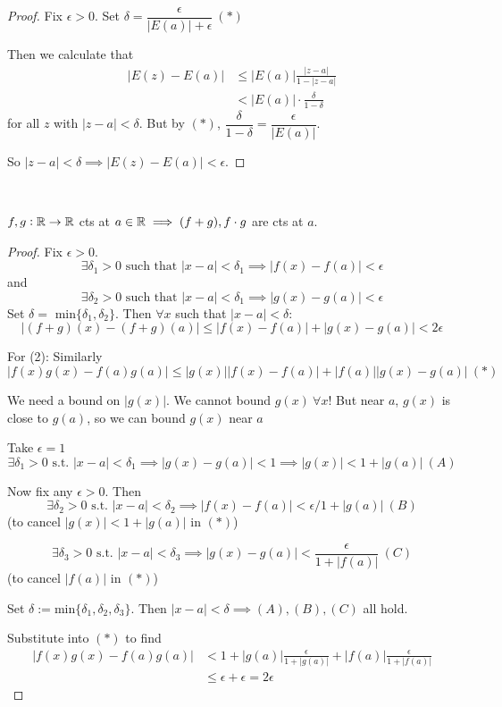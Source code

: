 \begin{proof}
Fix $\epsilon >0$. Set $\delta = \dfrac{\epsilon}{|E(a)| + \epsilon} ~(*)$

Then we calculate that 
\[\begin{aligned}
|E(z) - E(a)| &\leq |E(a)| \frac{|z-a|}{1-|z-a|} \\
&< |E(a)| \cdot \frac{\delta}{1-\delta}	
\end{aligned}
\]	
for all $z$ with $|z-a| < \delta$. But by $(*)$, $\dfrac{\delta}{1-\delta} = \dfrac{\epsilon}{|E(a)|}$. 

So $|z-a|< \delta \implies |E(z) - E(a)| < \epsilon$.
\end{proof}~


\begin{theorem}
$f,g: \mathbb{R} \to \mathbb{R}$ cts at $a \in \mathbb{R} \implies (f + g), f\cdot g$ are cts at $a$.
\end{theorem}
\begin{proof}
	Fix $\epsilon >0.$ \[\exists \delta_1 >0 \text{ such that }|x-a| < \delta_1 \implies |f(x) - f(a)| < \epsilon\] and\[\exists \delta_2 >0 \text{ such that }|x-a| < \delta_1 \implies |g(x) - g(a)| < \epsilon\]
	 Set $\delta =$ min$\{\delta_1,\delta_2\}.$ Then $\forall x$ such that $|x-a| < \delta:$
	\[|(f+g)(x) - (f+g)(a)| \leq |f(x) - f(a)| + |g(x) - g(a)| < 2\epsilon\]
	
	For (2): Similarly
	\[|f(x)g(x) - f(a)g(a)| \leq |g(x)||f(x) - f(a)| + |f(a)||g(x) - g(a)| ~(*)\]
	
	We need a bound on $|g(x)|$. We cannot bound $g(x)~ \forall x$!  But near $a$, $g(x)$ is close to $g(a)$, so we can bound $g(x)$ near $a$
	
	Take $\epsilon =1$ 
	\[\exists \delta_1 > 0\text{ s.t. }|x-a| < \delta_1 \implies |g(x) - g(a)| < 1 \implies |g(x)| < 1 + |g(a)| ~(A)\]
	
	Now fix any $\epsilon >0$. Then 
	\[\exists \delta_2 > 0\text{ s.t. }|x-a| < \delta_2 \implies |f(x) - f(a)| < \epsilon/1+|g(a)| ~ (B)\] (to cancel $|g(x)| < 1+|g(a)|$ in $(*)$)
	
	\[\exists \delta_3 > 0 \text{ s.t. } |x-a| < \delta_3 \implies |g(x) - g(a)| < \frac{\epsilon}{1 + |f(a)|}~ (C)\]
	(to cancel $|f(a)|$ in $(*)$)
	
	Set $\delta := \mathrm{min}\{\delta_1,\delta_2,\delta_3\}$. Then $|x-a| < \delta \implies (A), (B), (C)$ all hold. 
	
	Substitute into $(*)$ to find 
	\[\begin{aligned}|f(x)g(x) - f(a)g(a)| &< 1+|g(a)|\frac{\epsilon}{1+|g(a)|} + |f(a)|\frac{\epsilon}{1 + |f(a)|}\\
	&\leq \epsilon + \epsilon = 2\epsilon
\end{aligned}\]
\end{proof}


